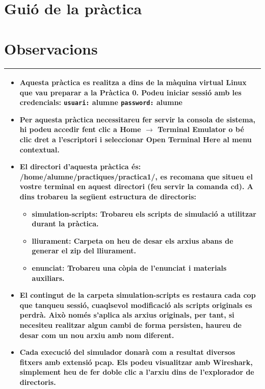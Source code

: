 \documentclass[12pt,a4paper]{article}
\begin{document}
\section{Guió de la pràctica}

\section*{Observacions}

 \begin{tabular}{||p{12cm}||}
 \hline\hline
 \begin{itemize}
 \item Aquesta pràctica es realitza a dins de la màquina virtual Linux que vau preparar a la Pràctica 0. Podeu iniciar sessió amb les credencials: 
   \newline \texttt{usuari:} \textbf{alumne}
   \newline \texttt{password:} \textbf{alumne}
 \item Per aquesta pràctica necessitareu fer servir la consola de sistema, hi podeu accedir fent clic a \textbf{Home} $\rightarrow$ \textbf{Terminal Emulator} o bé clic dret a l'escriptori i seleccionar \textbf{Open Terminal Here} al menu contextual.
 
 \item El directori d'aquesta pràctica és: \textbf{/home/alumne/practiques/practica1/}, es recomana que situeu el vostre terminal en aquest directori (feu servir la comanda \textbf{cd}). A dins trobareu la següent estructura de directoris:
    \begin{itemize}        
        \item\textbf{simulation-scripts}: Trobareu els scripts de simulació a utilitzar durant la pràctica.
        \item\textbf{lliurament}: Carpeta on heu de desar els arxius abans de generar el zip del lliurament.
        \item\textbf{enunciat}: Trobareu una còpia de l'enunciat i materials auxiliars.
    \end{itemize}
 
 \item El contingut de la carpeta \textbf{simulation-scripts} es restaura cada cop que tanqueu sessió, cuaqlsevol modificació als scripts originals es perdrà. Això només s'aplica als arxius originals, per tant, si necesiteu realitzar algun cambi de forma persisten, haureu de desar com un nou arxiu amb nom diferent.
 
 \item Cada execució del simulador donarà com a resultat diversos fitxers amb extensió \textbf{pcap}. Els podeu visualitzar amb \textbf{Wireshark}, simplement heu de fer doble clic a l'arxiu dins de l'explorador de directoris.  
 \end{itemize}
 \\\hline\hline
 \end{tabular}
 \medskip
 
\end{document}
